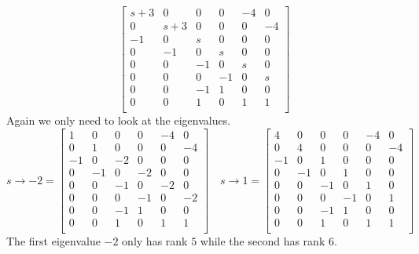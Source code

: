\documentclass{article}
\begin{document}
\begin{enumerate}[(a)]
$$
\begin{bmatrix}
s+3 &   0 & 0 & 0 &-4 & 0 \\
  0 & s+3 & 0 & 0 & 0 &-4 \\
 -1 &   0 & s & 0 & 0 & 0 \\
  0 &  -1 & 0 & s & 0 & 0 \\
  0 &   0 &-1 & 0 & s & 0 \\
  0 &   0 & 0 &-1 & 0 & s \\
  0 &   0 &-1 & 1 & 0 & 0 \\
  0 &   0 & 1 & 0 & 1 & 1 \\
\end{bmatrix}
$$
Again we only need to look at the eigenvalues.
$$
s \to -2 =
\begin{bmatrix}
  1 &   0 & 0 & 0 &-4 & 0 \\
  0 &   1 & 0 & 0 & 0 &-4 \\
 -1 &   0 &-2 & 0 & 0 & 0 \\
  0 &  -1 & 0 &-2 & 0 & 0 \\
  0 &   0 &-1 & 0 &-2 & 0 \\
  0 &   0 & 0 &-1 & 0 &-2 \\
  0 &   0 &-1 & 1 & 0 & 0 \\
  0 &   0 & 1 & 0 & 1 & 1 \\
\end{bmatrix}
\quad
s \to 1 =
\begin{bmatrix}
  4 &   0 & 0 & 0 &-4 & 0 \\
  0 &   4 & 0 & 0 & 0 &-4 \\
 -1 &   0 & 1 & 0 & 0 & 0 \\
  0 &  -1 & 0 & 1 & 0 & 0 \\
  0 &   0 &-1 & 0 & 1 & 0 \\
  0 &   0 & 0 &-1 & 0 & 1 \\
  0 &   0 &-1 & 1 & 0 & 0 \\
  0 &   0 & 1 & 0 & 1 & 1 \\
\end{bmatrix}
$$
The first eigenvalue $-2$ only has rank $5$ while the second has rank $6$. 



\end{enumerate}
\end{document}
